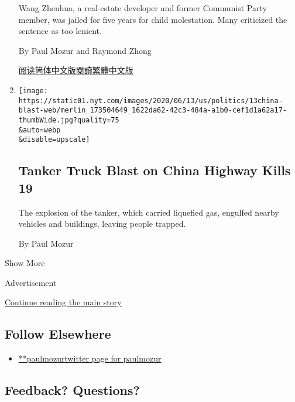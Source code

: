 \begin{enumerate}
  Wang Zhenhua, a real-estate developer and former Communist Party
  member, was jailed for five years for child molestation. Many
  criticized the sentence as too lenient.

  By Paul Mozur and Raymond Zhong

  \href{https://cn.nytimes.com/china/20200618/china-wang-zhenhua-sentence/}{阅读简体中文版}\href{https://cn.nytimes.com/china/20200618/china-wang-zhenhua-sentence/z}{閱讀繁體中文版}
\item
  \href{/2020/06/13/world/asia/china-tanker-truck-explosion.html}{}

  \texttt{[image: https://static01.nyt.com/images/2020/06/13/us/politics/13china-blast-web/merlin\_173504649\_1622da62-42c3-484a-a1b0-cef1d1a62a17-thumbWide.jpg?quality=75\\\&auto=webp\\\&disable=upscale]}

  \hypertarget{tanker-truck-blast-on-china-highway-kills-19}{%
  \subsection{Tanker Truck Blast on China Highway Kills
  19}\label{tanker-truck-blast-on-china-highway-kills-19}}

  The explosion of the tanker, which carried liquefied gas, engulfed
  nearby vehicles and buildings, leaving people trapped.

  By Paul Mozur
\end{enumerate}

Show More

Advertisement

\protect\hyperlink{after-mid2}{Continue reading the main story}

\hypertarget{follow-elsewhere}{%
\subsection{Follow Elsewhere}\label{follow-elsewhere}}

\begin{itemize}
\tightlist
\item
  \href{https://twitter.com/paulmozur}{**paulmozurtwitter page for
  paulmozur}
\end{itemize}

\hypertarget{feedback-questions}{%
\subsection{Feedback? Questions?}\label{feedback-questions}}

